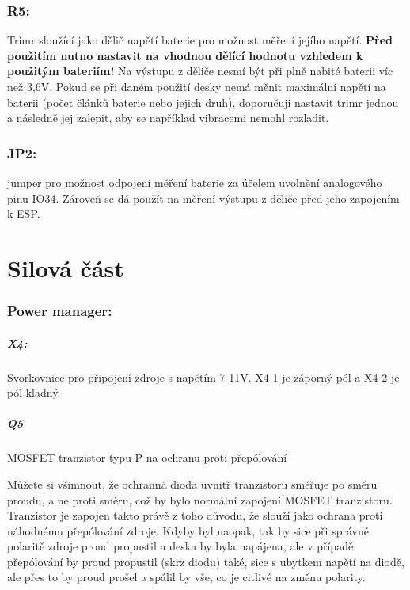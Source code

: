 \documentclass{template/socthesis}
\begin{document}
\begin{itemize}
	\subsection*{R5:}
	Trimr sloužící jako dělič napětí baterie pro možnost měření jejího napětí. 
	\textbf{Před použitím nutno nastavit na vhodnou dělící hodnotu vzhledem k použitým bateriím!} Na výstupu z děliče nesmí být při plně nabité baterii víc než 3,6V. Pokud se při daném použití desky nemá měnit maximální napětí na baterii (počet článků baterie nebo jejich druh), doporučuji nastavit trimr jednou a následně jej zalepit, aby se například vibracemi nemohl rozladit.
	
	\subsection*{JP2:}
	jumper pro možnost odpojení měření baterie za účelem uvolnění analogového pinu IO34. Zároveň se dá použít na měření výstupu z děliče před jeho zapojením k ESP.
	
	\chapter{Silová část}
	


	\subsection{Power manager:}
	
	\paragraph*{X4:}
	Svorkovnice pro připojení zdroje s napětím 7-11V. X4-1 je záporný pól a X4-2 je pól kladný.
	\paragraph*{Q5}
	MOSFET tranzistor typu P na ochranu proti přepólování
	
	Můžete si všimnout, že ochranná dioda uvnitř tranzistoru směřuje po směru proudu, a ne proti směru, což by bylo normální zapojení MOSFET tranzistoru.
	Tranzistor je zapojen takto právě z toho důvodu, že slouží jako ochrana proti náhodnému přepólování zdroje. Kdyby byl naopak, tak by sice při správné polaritě zdroje proud propustil a deska by byla napájena, ale v případě přepólování by proud propustil (skrz diodu) také, sice s ubytkem napětí na diodě, ale přes to by proud prošel a spálil by vše, co je citlivé na změnu polarity.

\end{itemize}
\end{document}

